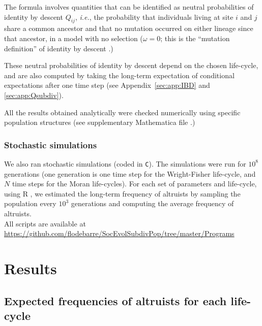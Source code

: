 \documentclass[11pt, letterpaper]{article}
\newcommand{\ie}{\textit{i.e.}}
\newcommand{\appname}[0]{Appendix}
\begin{document}
The formula involves quantities that can be identified as neutral probabilities of identity by descent $Q_{ij}$, \ie, the probability that individuals living at site $i$  and $j$ share a common ancestor and that no mutation occurred on either lineage since that ancestor, in a model with no selection ($\omega=0$; this is the ``mutation definition'' of identity by descent \citep{RoussetBilliard2000}.)

These neutral probabilities of identity by descent depend on the chosen life-cycle, and are also computed by taking the long-term expectation of conditional expectations after one time step (see \appname~\ref{sec:app:IBD} and \ref{sec:app:Qsubdiv}). 

All the results obtained analytically were checked numerically using specific population structures (see supplementary Mathematica file \citep{Mathematica11}.)

\subsubsection{Stochastic simulations}
We also ran stochastic simulations (coded in \texttt{C}). The simulations were run for $10^8$ generations (one generation is one time step for the Wright-Fisher life-cycle, and $N$ time steps for the Moran life-cycles). For each set of parameters and life-cycle, using R \citep{R2015}, we estimated the long-term frequency of altruists by sampling the population every $10^3$ generations and computing the average frequency of altruists.\\
%
All scripts are available at \\
{\small \url{https://github.com/flodebarre/SocEvolSubdivPop/tree/master/Programs}} 

\section{Results}


\subsection{Expected frequencies of altruists for each life-cycle}
\end{document}
